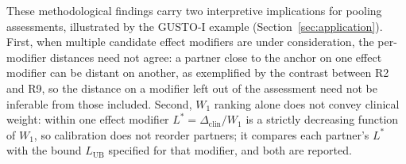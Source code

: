 \documentclass[AMA,Times1COL]{WileyNJDv5}
\begin{document}
These methodological findings carry two interpretive implications for pooling assessments, illustrated by the GUSTO-I example (Section~\ref{sec:application}). First, when multiple candidate effect modifiers are under consideration, the per-modifier distances need not agree: a partner close to the anchor on one effect modifier can be distant on another, as exemplified by the contrast between R2 and R9, so the distance on a modifier left out of the assessment need not be inferable from those included. Second, $W_1$ ranking alone does not convey clinical weight: within one effect modifier $L^* = \Delta_{\text{clin}} / W_1$ is a strictly decreasing function of $W_1$, so calibration does not reorder partners; it compares each partner's $L^*$ with the bound $L_{\text{UB}}$ specified for that modifier, and both are reported.
\end{document}
